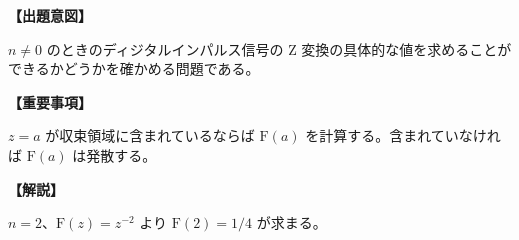 \noindent \textbf{【出題意図】}

\bigskip
\noindent $n \ne 0 $ のときのディジタルインパルス信号の Z 変換の具体的な値を求めることができるかどうかを確かめる問題である。

\vspace{1em}
\noindent \textbf{【重要事項】}

\medskip
$z = a$ が収束領域に含まれているならば $\textrm{F}(a)$ を計算する。含まれていなければ $\textrm{F}(a)$ は発散する。

\bigskip

\vspace{1em}
\noindent \textbf{【解説】}

\bigskip
\noindent $n = 2$、$\textrm{F}(z) = z^{-2}$  より $\textrm{F}(2) = 1/4$ が求まる。

